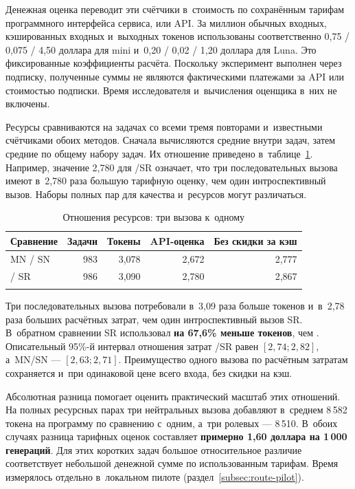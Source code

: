 Денежная оценка переводит эти счётчики в~стоимость по сохранённым тарифам программного интерфейса сервиса, или API. За миллион обычных входных, кэшированных входных и~выходных токенов использованы соответственно 0,75 / 0,075 / 4,50 доллара для mini и~0,20 / 0,02 / 1,20 доллара для Luna. Это фиксированные коэффициенты расчёта. Поскольку эксперимент выполнен через подписку, полученные суммы не являются фактическими платежами за API или стоимостью подписки. Время исследователя и~вычисления оценщика в~них не включены.

Ресурсы сравниваются на задачах со всеми тремя повторами и~известными счётчиками обоих методов. Сначала вычисляются средние внутри задач, затем средние по общему набору задач. Их отношение приведено в~таблице~\ref{tab:scale-resources}. Например, значение 2,780 для \MultiCallRole{}/SR означает, что три последовательных вызова имеют в~2,780 раза большую тарифную оценку, чем один интроспективный вызов. Наборы полных пар для качества и~ресурсов могут различаться.

\begin{table}[htbp]
\caption{Отношения ресурсов: три вызова к~одному}
\label{tab:scale-resources}
\centering\small\renewcommand{\arraystretch}{1.2}
\begin{tabular}{@{}lrrrr@{}}
\toprule
Сравнение & Задачи & Токены & API-оценка & Без скидки за кэш \\
\midrule
MN / SN & 983 & 3,078 & 2,672 & 2,777 \\
\MultiCallRole{} / SR & 986 & 3,090 & 2,780 & 2,867 \\
\botrule
\end{tabular}
\end{table}
\FloatBarrier

Три последовательных вызова \MultiCallRole{} потребовали в~3,09 раза больше токенов и~в~2,78 раза больших расчётных затрат, чем один интроспективный вызов SR. В~обратном сравнении SR использовал \textbf{на 67,6\% меньше токенов}, чем \MultiCallRole{}. Описательный 95\%-й интервал отношения затрат \MultiCallRole{}/SR равен $[2{,}74;2{,}82]$, а~MN/SN --- $[2{,}63;2{,}71]$. Преимущество одного вызова по расчётным затратам сохраняется и~при одинаковой цене всего входа, без скидки на кэш.

Абсолютная разница помогает оценить практический масштаб этих отношений. На полных ресурсных парах три нейтральных вызова добавляют в~среднем 8\,582 токена на программу по сравнению с~одним, а~три ролевых --- 8\,510. В~обоих случаях разница тарифных оценок составляет \textbf{примерно 1,60 доллара на 1\,000 генераций}. Для этих коротких задач большое относительное различие соответствует небольшой денежной сумме по использованным тарифам. Время измерялось отдельно в~локальном пилоте (раздел~\ref{subsec:route-pilot}).

